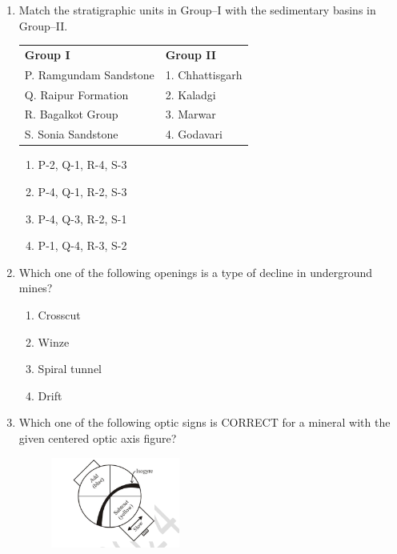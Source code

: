\documentclass[journal,12pt,onecolumn]{IEEEtran}
\begin{document}
\begin{enumerate}
\hfill{}

\item Match the stratigraphic units in Group--I with the sedimentary basins in Group--II.  

\begin{tabular}{p{} p{}}
\textbf{Group I} & \textbf{Group II} \\
P. Ramgundam Sandstone & 1. Chhattisgarh \\
Q. Raipur Formation & 2. Kaladgi\\
 
R. Bagalkot Group & 3. Marwar  \\
S. Sonia Sandstone& 4. Godavari \\
\end{tabular}   

\hfill{}


\begin{enumerate}
\item P-2, Q-1, R-4, S-3
\item P-4, Q-1, R-2, S-3
\item P-4, Q-3, R-2, S-1
\item P-1, Q-4, R-3, S-2
\end{enumerate}


\item Which one of the following openings is a type of decline in underground mines?  

\hfill{}

\begin{multicols}{4}
\begin{enumerate}
\item Crosscut
\item Winze
\item Spiral tunnel
\item Drift
\end{enumerate}
\end{multicols}

\item Which one of the following optic signs is CORRECT for a mineral with the given centered optic axis figure?  

\begin{figure}[h!]
    \centering
    \includegraphics[width=0.4\textwidth]{figs/fig5.png}
    \caption{}
    \label{fig:q18}
\end{figure}




\end{enumerate}
\end{document}
